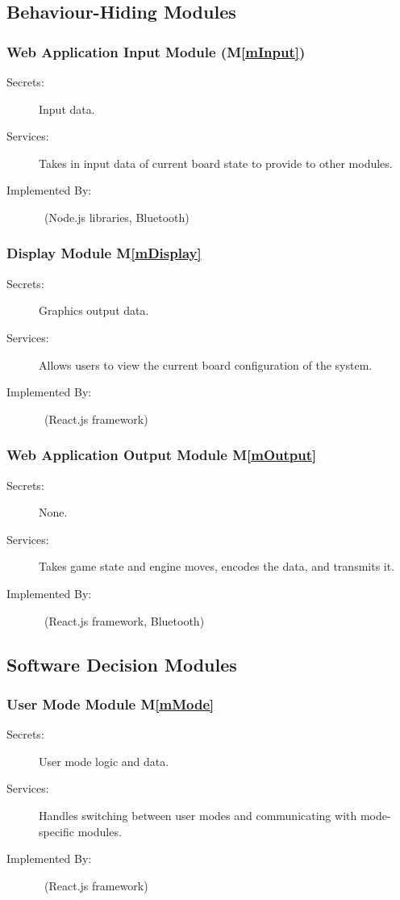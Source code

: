 \documentclass[12pt, titlepage]{article}
\newcommand{\mref}[1]{M\ref{#1}}
\begin{document}
\subsection{Behaviour-Hiding Modules}
    \subsubsection{Web Application Input Module (\mref{mInput})}
    \begin{description}
    \item[Secrets:] Input data.
    \item[Services:] Takes in input data of current board state to provide to other modules.
    \item[Implemented By:] \progname\ (Node.js libraries, Bluetooth)
    \end{description}
    
    \subsubsection{Display Module \mref{mDisplay}} 
    \begin{description}
    \item[Secrets:] Graphics output data.
    \item[Services:] Allows users to view the current board configuration of the system.
    \item[Implemented By:] \progname\ (React.js framework)
    \end{description}

    \subsubsection{Web Application Output Module \mref{mOutput}} 
    \begin{description}
    \item[Secrets:] None.
    \item[Services:] Takes game state and engine moves, encodes the data, and transmits it.
    \item[Implemented By:] \progname\ (React.js framework, Bluetooth)
    \end{description}

\subsection{Software Decision Modules}
    \subsubsection{User Mode Module \mref{mMode}}
    \begin{description}
    \item[Secrets:] User mode logic and data.
    \item[Services:] Handles switching between user modes and communicating with mode-specific modules.
    \item[Implemented By:] \progname\ (React.js framework)
    \end{description}
\end{document}

